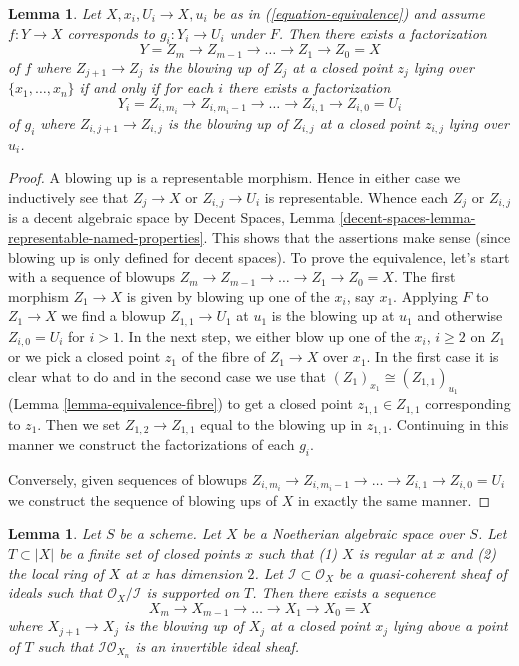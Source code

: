 \documentclass{stacks-project}
\theoremstyle{plain}
\newtheorem{lemma}[subsection]{Lemma}
\theoremstyle{definition}
\theoremstyle{remark}
\numberwithin{equation}{subsection}
\begin{document}
\begin{lemma}
\label{lemma-equivalence-sequence-blowups}
Let $X, x_i, U_i \to X, u_i$ be as in (\ref{equation-equivalence})
and assume $f : Y \to X$ corresponds to $g_i : Y_i \to U_i$ under $F$.
Then there exists a factorization
$$
Y = Z_m \to Z_{m - 1} \to \ldots \to Z_1 \to Z_0 = X
$$
of $f$ where $Z_{j + 1} \to Z_j$ is the blowing up of $Z_j$ at a closed
point $z_j$ lying over $\{x_1, \ldots, x_n\}$ if and only if for each
$i$ there exists a factorization
$$
Y_i = Z_{i, m_i} \to Z_{i, m_i - 1} \to \ldots \to Z_{i, 1} \to Z_{i, 0} = U_i
$$
of $g_i$ where $Z_{i, j + 1} \to Z_{i, j}$ is the blowing up of $Z_{i, j}$
at a closed point $z_{i, j}$ lying over $u_i$.
\end{lemma}

\begin{proof}
A blowing up is a representable morphism. Hence in either case
we inductively see that $Z_j \to X$ or $Z_{i, j} \to U_i$ is
representable. Whence each $Z_j$ or $Z_{i, j}$ is a decent
algebraic space by Decent Spaces, Lemma
\ref{decent-spaces-lemma-representable-named-properties}.
This shows that the assertions make sense (since blowing up
is only defined for decent spaces).
To prove the equivalence, let's start with a sequence of blowups
$Z_m \to Z_{m - 1} \to \ldots \to Z_1 \to Z_0 = X$.
The first morphism $Z_1 \to X$ is given
by blowing up one of the $x_i$, say $x_1$. Applying $F$
to $Z_1 \to X$ we find a blowup $Z_{1, 1} \to U_1$ at $u_1$
is the blowing up at $u_1$ and otherwise $Z_{i, 0} = U_i$ for $i > 1$.
In the next step, we either blow up one of the $x_i$, $i \geq 2$
on $Z_1$ or we pick a closed point $z_1$ of the fibre of $Z_1 \to X$
over $x_1$. In the first case it is clear what to do and in
the second case we use that $(Z_1)_{x_1} \cong (Z_{1, 1})_{u_1}$
(Lemma \ref{lemma-equivalence-fibre})
to get a closed point $z_{1, 1} \in Z_{1, 1}$ corresponding to $z_1$.
Then we set $Z_{1, 2} \to Z_{1, 1}$ equal to the blowing up
in $z_{1, 1}$. Continuing in this manner we construct the factorizations
of each $g_i$.

\medskip\noindent
Conversely, given sequences of blowups
$Z_{i, m_i} \to Z_{i, m_i - 1} \to \ldots \to Z_{i, 1} \to Z_{i, 0} = U_i$
we construct the sequence of blowing ups of $X$ in exactly the same manner.
\end{proof}

\begin{lemma}
\label{lemma-make-ideal-principal}
Let $S$ be a scheme. Let $X$ be a Noetherian algebraic space over $S$.
Let $T \subset |X|$ be a finite set of closed points $x$ such that
(1) $X$ is regular at $x$ and (2) the local ring of $X$ at $x$ has
dimension $2$. Let $\mathcal{I} \subset \mathcal{O}_X$ be a quasi-coherent
sheaf of ideals such that $\mathcal{O}_X/\mathcal{I}$ is supported on $T$.
Then there exists a sequence
$$
X_m \to X_{m - 1} \to \ldots \to X_1 \to X_0 = X
$$
where $X_{j + 1} \to X_j$ is the blowing up of $X_j$ at a closed
point $x_j$ lying above a point of $T$ such that
$\mathcal{I}\mathcal{O}_{X_n}$ is an invertible ideal sheaf.
\end{lemma}
\end{document}

